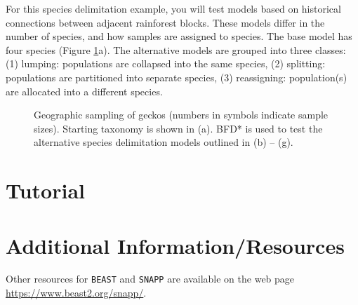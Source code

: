 \documentclass{article}
\begin{document}
For this species delimitation example, you will test models based on historical connections between adjacent rainforest blocks. These models differ in the number of species, and how samples are assigned to species. The base model has four species (Figure \ref{fig:map}a). The alternative models are grouped into three classes: (1) lumping: populations are collapsed into the same species, (2) splitting: populations are partitioned into separate species, (3) reassigning: population(s) are allocated into a different species.

    \begin{figure}[htbp]
        \centering
        \caption{Geographic sampling of geckos (numbers in symbols indicate sample sizes). Starting taxonomy is shown in (a). BFD* is used to test the alternative species delimitation models outlined in (b) -- (g).}
        \label{fig:map}
    \end{figure}

\section{Tutorial}
\newcommand{\step}[2]{\addtocounter{stepCounter}{1} {\bf \hypertarget{step\arabic{stepCounter}}{Step \arabic{stepCounter}:}}\xspace #2\par}
\newcommand{\intermediate}[1]{#1}


\section{Additional Information/Resources}
Other resources for \texttt{BEAST} and \texttt{SNAPP} are available on the web page \href{https://www.beast2.org/snapp/}{https://www.beast2.org/snapp/}.

\newpage

\end{document}
